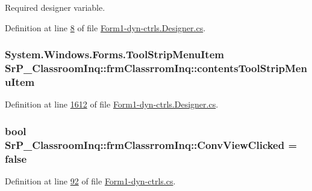 \-Required designer variable. 



\-Definition at line \hyperlink{_form1-dyn-ctrls_8_designer_8cs_source_l00008}{8} of file \hyperlink{_form1-dyn-ctrls_8_designer_8cs_source}{\-Form1-\/dyn-\/ctrls.\-Designer.\-cs}.

\hypertarget{class_sr_p___classroom_inq_1_1frm_classrrom_inq_ac8e6b07efe8b6fe7e1a82d326648f88e}{
\subsubsection[{contents\-Tool\-Strip\-Menu\-Item}]{\setlength{\rightskip}{0pt plus 5cm}\-System.\-Windows.\-Forms.\-Tool\-Strip\-Menu\-Item {\bf \-Sr\-P\-\_\-\-Classroom\-Inq\-::frm\-Classrrom\-Inq\-::contents\-Tool\-Strip\-Menu\-Item}}}
\label{class_sr_p___classroom_inq_1_1frm_classrrom_inq_ac8e6b07efe8b6fe7e1a82d326648f88e}


\-Definition at line \hyperlink{_form1-dyn-ctrls_8_designer_8cs_source_l01612}{1612} of file \hyperlink{_form1-dyn-ctrls_8_designer_8cs_source}{\-Form1-\/dyn-\/ctrls.\-Designer.\-cs}.

\hypertarget{class_sr_p___classroom_inq_1_1frm_classrrom_inq_a567cf412a542927bb47984c0e835a7d2}{
\subsubsection[{\-Conv\-View\-Clicked}]{\setlength{\rightskip}{0pt plus 5cm}bool {\bf \-Sr\-P\-\_\-\-Classroom\-Inq\-::frm\-Classrrom\-Inq\-::\-Conv\-View\-Clicked} = false}}
\label{class_sr_p___classroom_inq_1_1frm_classrrom_inq_a567cf412a542927bb47984c0e835a7d2}


\-Definition at line \hyperlink{_form1-dyn-ctrls_8cs_source_l00092}{92} of file \hyperlink{_form1-dyn-ctrls_8cs_source}{\-Form1-\/dyn-\/ctrls.\-cs}.

